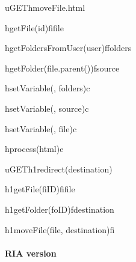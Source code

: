 \documentclass[a4paper, dvipsnames]{article}
\begin{document}
	\begin{center}
		\begin{sequencediagram}
			
			\begin{call}{u}{GET}{h}{moveFile.html}
				\begin{call}{h}{getFile(id)}{fi}{file}
				\end{call}
				\begin{call}{h}{getFoldersFromUser(user)}{f}{folders}
				\end{call}
				\begin{call}{h}{getFolder(file.parent())}{f}{source}
				\end{call}
				\begin{call}{h}{setVariable(, folders)}{c}{}
				\end{call}
				\begin{call}{h}{setVariable(, source)}{c}{}
				\end{call}
				\begin{call}{h}{setVariable(, file)}{c}{}
				\end{call}
				\begin{call}{h}{process(html)}{e}{}
				\end{call}
			\end{call}
			
			\begin{call}{u}{GET}{h1}{redirect(destination)}
				\begin{call}{h1}{getFile(fiID)}{fi}{file}
				\end{call}
				\begin{call}{h1}{getFolder(foID)}{f}{destination}
				\end{call}
				\begin{call}{h1}{moveFile(file, destination)}{fi}{}
				\end{call}
			\end{call}
		\end{sequencediagram}
	\end{center}
	
	\paragraph{RIA version}
	
\end{document}
